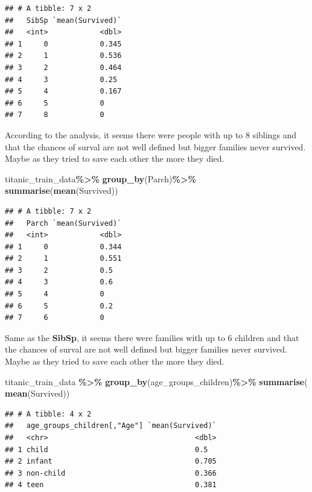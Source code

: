 \documentclass[
]{article}
\newenvironment{Shaded}{\begin{snugshade}}{\end{snugshade}}
\newcommand{\FunctionTok}[1]{\textcolor[rgb]{0.13,0.29,0.53}{\textbf{#1}}}
\newcommand{\NormalTok}[1]{#1}
\newcommand{\SpecialCharTok}[1]{\textcolor[rgb]{0.81,0.36,0.00}{\textbf{#1}}}
\begin{document}
\begin{verbatim}
## # A tibble: 7 x 2
##   SibSp `mean(Survived)`
##   <int>            <dbl>
## 1     0            0.345
## 2     1            0.536
## 3     2            0.464
## 4     3            0.25 
## 5     4            0.167
## 6     5            0    
## 7     8            0
\end{verbatim}

According to the analysis, it seems there were people with up to 8
siblings and that the chances of surval are not well defined but bigger
families never survived. Maybe as they tried to save each other the more
they died.

\begin{Shaded}
\begin{Highlighting}[]
\NormalTok{titanic\_train\_data}\SpecialCharTok{\%\textgreater{}\%}
  \FunctionTok{group\_by}\NormalTok{(Parch)}\SpecialCharTok{\%\textgreater{}\%}
  \FunctionTok{summarise}\NormalTok{(}\FunctionTok{mean}\NormalTok{(Survived))}
\end{Highlighting}
\end{Shaded}

\begin{verbatim}
## # A tibble: 7 x 2
##   Parch `mean(Survived)`
##   <int>            <dbl>
## 1     0            0.344
## 2     1            0.551
## 3     2            0.5  
## 4     3            0.6  
## 5     4            0    
## 6     5            0.2  
## 7     6            0
\end{verbatim}

Same as the \textbf{SibSp}, it seems there were families with up to 6
children and that the chances of surval are not well defined but bigger
families never survived. Maybe as they tried to save each other the more
they died.

\begin{Shaded}
\begin{Highlighting}[]
\NormalTok{titanic\_train\_data }\SpecialCharTok{\%\textgreater{}\%}
  \FunctionTok{group\_by}\NormalTok{(age\_groups\_children)}\SpecialCharTok{\%\textgreater{}\%}
  \FunctionTok{summarise}\NormalTok{( }\FunctionTok{mean}\NormalTok{(Survived))}
\end{Highlighting}
\end{Shaded}

\begin{verbatim}
## # A tibble: 4 x 2
##   age_groups_children[,"Age"] `mean(Survived)`
##   <chr>                                  <dbl>
## 1 child                                  0.5  
## 2 infant                                 0.705
## 3 non-child                              0.366
## 4 teen                                   0.381
\end{verbatim}
\end{document}
